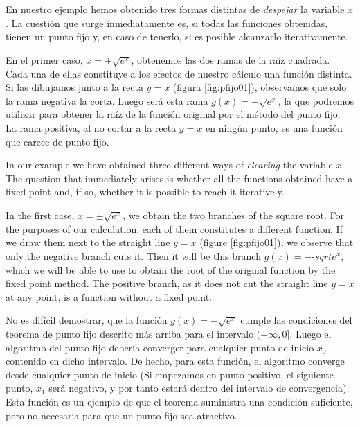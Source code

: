 \begin{paracol}{2}
    
En nuestro ejemplo hemos obtenido tres formas distintas de \emph{despejar} la variable $x$. La cuestión que surge inmediatamente es, si todas las funciones obtenidas, tienen un punto fijo y, en caso de tenerlo, si es posible alcanzarlo iterativamente.

En el primer caso, $x=\pm \sqrt{e^x}$, obtenemos las dos ramas de la raíz cuadrada. Cada una de ellas constituye a los efectos de nuestro cálculo una función distinta. Si las dibujamos junto a la recta $y=x$ (figura \ref{fig:pfijo01}), observamos que solo la rama negativa la corta. Luego será  esta rama $g(x)=-\sqrt{e^x}$,  la que podremos utilizar para obtener la raíz de la función original por el método del punto fijo. La rama positiva, al no cortar a la recta $y=x$ en ningún punto, es una función que carece de punto fijo.

\switchcolumn
    
In our example we have obtained three different ways of \emph{clearing} the variable $x$. The question that immediately arises is whether all the functions obtained have a fixed point and, if so, whether it is possible to reach it iteratively.

In the first case, $x=\pm \sqrt{e^x}$, we obtain the two branches of the square root. For the purposes of our calculation, each of them constitutes a different function. If we draw them next to the straight line $y=x$ (figure \ref{fig:pfijo01}), we observe that only the negative branch cuts it. Then it will be this branch $g(x)=-$-$sqrt{e^x}$, which we will be able to use to obtain the root of the original function by the fixed point method. The positive branch, as it does not cut the straight line $y=x$ at any point, is a function without a fixed point.

\switchcolumn
No es difícil demostrar, que la función $g(x)=-\sqrt{e^x} $ cumple las condiciones del teorema de punto fijo descrito más arriba para el intervalo $(-\infty, 0]$. Luego el algoritmo del punto fijo debería converger para cualquier punto de inicio $x_0$ contenido en dicho intervalo. De hecho, para esta función, el algoritmo converge desde cualquier punto de inicio (Si empezamos en punto positivo, el siguiente punto, $x_1$ será negativo, y por tanto estará dentro del intervalo de convergencia). Esta función es un ejemplo de que el teorema suministra una condición suficiente, pero no necesaria para que un punto fijo sea atractivo. 
\switchcolumn


\end{paracol}
